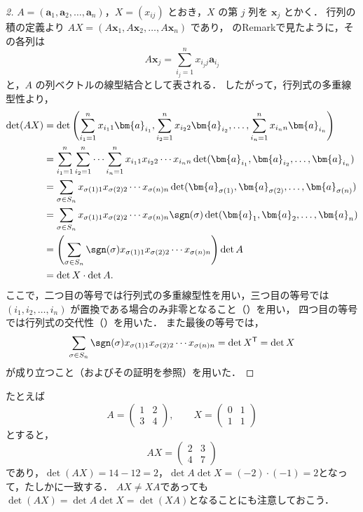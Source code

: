 \begin{tleftbar}
\begin{proof}[2]
  $A=(\bm{a}_1,\bm{a}_2,\dots,\bm{a}_n)$，$X=(x_{ij})$ とおき，$X$ の第 $j$ 列を $\bm{x}_j$ とかく．
  行列の積の定義より $AX=(A\bm{x}_1,A\bm{x}_2,\dots,A\bm{x}_n)$ であり，
  のRemarkで見たように，その各列は
  \[
    A\bm{x}_j=\sum_{i_j=1}^{n} x_{i_j j}\bm{a}_{i_j}
  \]
  と，$A$ の列ベクトルの線型結合として表される．
  したがって，行列式の多重線型性より，
  \begin{align*}
    \det(AX)
    &=
    \det\left(
      \sum_{i_1=1}^{n} x_{i_1 1}\bm{a}_{i_1},
      \sum_{i_2=1}^{n} x_{i_2 2}\bm{a}_{i_2},
      \dots,
      \sum_{i_n=1}^{n} x_{i_n n}\bm{a}_{i_n}
    \right) \\
    &=
    \sum_{i_1=1}^{n}\sum_{i_2=1}^{n}\dotsm\sum_{i_n=1}^{n}
    x_{i_1 1}x_{i_2 2}\dotsm x_{i_n n}
    \det(\bm{a}_{i_1},\bm{a}_{i_2},\dots,\bm{a}_{i_n}) \\
    &=
    \sum_{\sigma\in S_n}
    x_{\sigma(1)1}x_{\sigma(2)2}\dotsm x_{\sigma(n)n}
    \det(\bm{a}_{\sigma(1)},\bm{a}_{\sigma(2)},\dots,\bm{a}_{\sigma(n)}) \\
    &=
    \sum_{\sigma\in S_n}
    x_{\sigma(1)1}x_{\sigma(2)2}\dotsm x_{\sigma(n)n}
    \sgn(\sigma)\det(\bm{a}_1,\bm{a}_2,\dots,\bm{a}_n) \\
    &=
    \left(
      \sum_{\sigma\in S_n}
      \sgn(\sigma)
      x_{\sigma(1)1}x_{\sigma(2)2}\dotsm x_{\sigma(n)n}
    \right)\det A \\
    &=
    \det X \cdot \det A.
  \end{align*}
  ここで，二つ目の等号では行列式の多重線型性を用い，三つ目の等号では
  $(i_1,i_2,\dots,i_n)$ が置換である場合のみ非零となること（）を用い，
  四つ目の等号では行列式の交代性（）を用いた．
  また最後の等号では，
  \[
    \sum_{\sigma\in S_n}\sgn(\sigma)x_{\sigma(1)1}x_{\sigma(2)2}\dotsm x_{\sigma(n)n}
    =\det X^{\mathsf{T}}=\det X
  \]
  が成り立つこと（およびその証明を参照）を用いた．
\end{proof}
\end{tleftbar}

たとえば
\[
  A = \begin{pmatrix} 1 & 2 \\ 3 & 4 \end{pmatrix}, \qquad
  X = \begin{pmatrix} 0 & 1 \\ 1 & 1 \end{pmatrix}
\]
とすると，
\[
  AX = \begin{pmatrix} 2 & 3 \\ 4 & 7 \end{pmatrix}
\]
であり，$\det(AX) = 14 - 12 = 2$，$\det A \det X = (-2) \cdot (-1) = 2$となって，たしかに一致する．
$AX \ne XA$であっても$\det(AX) = \det A \det X = \det(XA)$となることにも注意しておこう．

